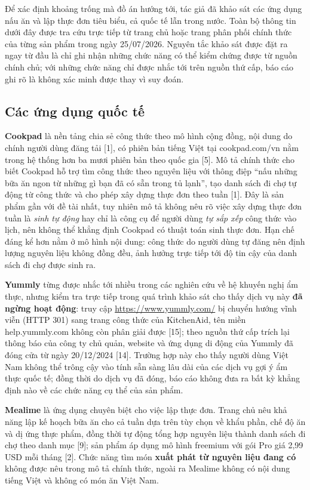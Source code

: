Để xác định khoảng trống mà đồ án hướng tới, tác giả đã khảo sát các ứng dụng
nấu ăn và lập thực đơn tiêu biểu, cả quốc tế lẫn trong nước. Toàn bộ thông tin
dưới đây được tra cứu trực tiếp từ trang chủ hoặc trang phân phối chính thức của
từng sản phẩm trong ngày 25/07/2026. Nguyên tắc khảo sát được đặt ra ngay từ đầu
là chỉ ghi nhận những chức năng có thể kiểm chứng được từ nguồn chính chủ; với
những chức năng chỉ được nhắc tới trên nguồn thứ cấp, báo cáo ghi rõ là không xác
minh được thay vì suy đoán.

\subsection{Các ứng dụng quốc tế}

\textbf{Cookpad} là nền tảng chia sẻ công thức theo mô hình cộng đồng, nội dung
do chính người dùng đăng tải [1], có phiên bản tiếng Việt tại cookpad.com/vn
nằm trong hệ thống hơn ba mươi phiên bản theo quốc gia [5]. Mô tả chính thức cho
biết Cookpad hỗ trợ tìm công thức theo nguyên liệu với thông điệp ``nấu những
bữa ăn ngon từ những gì bạn đã có sẵn trong tủ lạnh'', tạo danh sách đi chợ tự
động từ công thức và cho phép xây dựng thực đơn theo tuần [1]. Đây là sản phẩm
gần với đề tài nhất, tuy nhiên mô tả không nêu rõ việc xây dựng thực đơn tuần là
\textit{sinh tự động} hay chỉ là công cụ để người dùng \textit{tự sắp xếp} công
thức vào lịch, nên không thể khẳng định Cookpad có thuật toán sinh thực đơn.
Hạn chế đáng kể hơn nằm ở mô hình nội dung: công thức do người dùng tự đăng nên
định lượng nguyên liệu không đồng đều, ảnh hưởng trực tiếp tới độ tin cậy của
danh sách đi chợ được sinh ra.

\textbf{Yummly} từng được nhắc tới nhiều trong các nghiên cứu về hệ khuyến nghị
ẩm thực, nhưng kiểm tra trực tiếp trong quá trình khảo sát cho thấy dịch vụ này
\textbf{đã ngừng hoạt động}: truy cập \url{https://www.yummly.com/} bị chuyển
hướng vĩnh viễn (HTTP 301) sang trang công thức của KitchenAid, tên miền
help.yummly.com không còn phân giải được [15]; theo nguồn thứ cấp trích lại
thông báo của công ty chủ quản, website và ứng dụng di động của Yummly đã đóng
cửa từ ngày 20/12/2024 [14]. Trường hợp này cho thấy người dùng Việt Nam không
thể trông cậy vào tính sẵn sàng lâu dài của các dịch vụ gợi ý ẩm thực quốc tế;
đồng thời do dịch vụ đã đóng, báo cáo không đưa ra bất kỳ khẳng định nào về các
chức năng cụ thể của sản phẩm.

\textbf{Mealime} là ứng dụng chuyên biệt cho việc lập thực đơn. Trang chủ nêu
khả năng lập kế hoạch bữa ăn cho cả tuần dựa trên tùy chọn về khẩu phần, chế độ
ăn và dị ứng thực phẩm, đồng thời tự động tổng hợp nguyên liệu thành danh sách
đi chợ theo danh mục [9]; sản phẩm áp dụng mô hình freemium với gói Pro giá 2,99
USD mỗi tháng [2]. Chức năng tìm món \textbf{xuất phát từ nguyên liệu đang có}
không được nêu trong mô tả chính thức, ngoài ra Mealime không có nội dung tiếng
Việt và không có món ăn Việt Nam.

